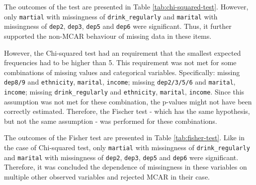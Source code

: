 \documentclass[
]{article}
\begin{document}
The outcomes of the test are presented in Table \ref{tab:chi-squared-test}. However, only \texttt{martial} with missingness of \texttt{drink\_regularly} and \texttt{marital} with missingness of \texttt{dep2}, \texttt{dep3}, \texttt{dep5} and \texttt{dep6} were significant. Thus, it further supported the non-MCAR behaviour of missing data in these items.

However, the Chi-squared test had an requirement that the smallest expected frequencies had to be higher than 5. This requirement was not met for some combinations of missing values and categorical variables. Specifically: missing \texttt{dep8/9} and \texttt{ethnicity}, \texttt{marital}, \texttt{income}; missing \texttt{dep2/3/5/6} and \texttt{marital}, \texttt{income}; missing \texttt{drink\_regularly} and \texttt{ethnicity}, \texttt{marital}, \texttt{income}. Since this assumption was not met for these combination, the p-values might not have been correctly estimated. Therefore, the Fischer test - which has the same hypothesis, but not the same assumption - was performed for these combinations.

\begin{table}[!h]

\caption{\label{tab:fisher-test}Fisher test}
\centering
{}
\end{table}

The outcomes of the Fisher test are presented in Table \ref{tab:fisher-test}. Like in the case of Chi-squared test, only \texttt{martial} with missingness of \texttt{drink\_regularly} and \texttt{marital} with missingness of \texttt{dep2}, \texttt{dep3}, \texttt{dep5} and \texttt{dep6} were significant. Therefore, it was concluded the dependence of missingness in these variables on multiple other observed variables and rejected MCAR in their case.
\end{document}
